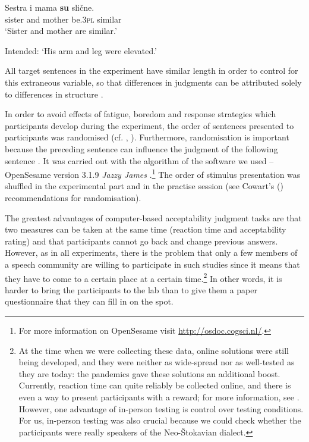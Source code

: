 \begin{exe}\ex\label{(16.9)}
\gll Sestra i mama \textbf{su} slične.\\
 sister and mother be.3\textsc{pl} similar\\
\glt ‘Sister and mother are similar.’

\glt Intended: ‘His arm and leg were elevated.’
\end{exe}

\noindent All target sentences in the experiment have similar length in order to control for this extraneous variable, so that differences in judgments can be attributed solely to differences in structure \citep[cf.][45]{Cowart97}.

In order to avoid effects of fatigue, boredom and response strategies which participants develop during the experiment, the order of sentences presented to participants was randomised (cf. \citealt[][51, 94]{Cowart97}, \citealt[][82]{KrugSell13}). Furthermore, randomisation is important because the preceding sentence can influence the judgment of the following sentence \citep[cf.][51f]{Cowart97}. It was carried out with the algorithm of the software we used – OpenSesame version 3.1.9 \textit{Jazzy James} \citep[][]{MST12}.\footnote{For more information on OpenSesame visit \url{http://osdoc.cogsci.nl/}.} The order of stimulus presentation was shuffled in the experimental part and in the practise session (see Cowart's (\citeyear[][96]{Cowart97}) recommendations for randomisation). 

The greatest advantages of computer-based acceptability judgment tasks are that two measures can be taken at the same time (reaction time and acceptability rating) and that participants cannot go back and change previous answers. However, as in all experiments, there is the problem that only a few members of a speech community are willing to participate in such studies since it means that they have to come to a certain place at a certain time.\footnote{At the time when we were collecting these data, online solutions were still being developed, and they were neither as wide-spread nor as well-tested as they are today: the pandemics gave these solutions an additional boost. Currently, reaction time can quite reliably be collected online, and there is even a way to present participants with a reward; for more information, see \citet{filipovic21}. However, one advantage of in-person testing is control over testing conditions. For us, in-person testing was also crucial because we could check whether the participants were really speakers of the Neo-Štokavian dialect.} In other words, it is harder to bring the participants to the lab than to give them a paper questionnaire that they can fill in on the spot. 

